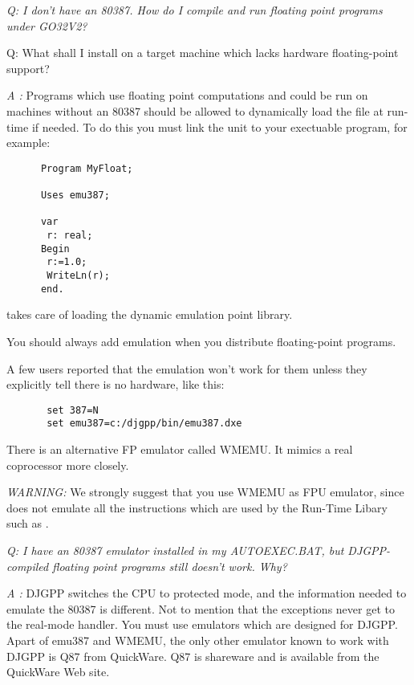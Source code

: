 \documentclass{report}
\begin{document}
{\em Q: I don't have an 80387. How do I compile and run floating point
   programs under GO32V2?

     Q: What shall I install on a target machine which lacks hardware
   floating-point support?
}

{\em A :}
 Programs which use floating point computations and could be run on
   machines without an 80387 should be allowed to dynamically load the
   file at run-time if needed. To do this you must link the  unit to your
   exectuable program, for example:

\begin{verbatim}
      Program MyFloat;

      Uses emu387;

      var
       r: real;
      Begin
       r:=1.0;
       WriteLn(r);
      end.
\end{verbatim}

    takes care of loading the dynamic emulation point library.

   You should always add emulation when you distribute floating-point
   programs.

   A few users reported that the emulation won't work for them unless
   they explicitly tell  there is no  hardware, like this:

\begin{verbatim}
       set 387=N
       set emu387=c:/djgpp/bin/emu387.dxe
\end{verbatim}

   There is an alternative FP emulator called WMEMU. It mimics a real
   coprocessor more closely.

   {\em WARNING:} We strongly suggest that you use WMEMU as FPU emulator, since
    does not emulate all the instructions which are used by the
   Run-Time Libary such as .


{\em   Q: I have an 80387 emulator installed in my AUTOEXEC.BAT, but
   DJGPP-compiled floating point programs still doesn't work. Why?
}


{\em   A :} DJGPP switches the CPU to protected mode, and the information
   needed to emulate the 80387 is different. Not to mention that the
   exceptions never get to the real-mode handler. You must use emulators
   which are designed for DJGPP. Apart of emu387 and WMEMU, the only
   other emulator known to work with DJGPP is Q87 from QuickWare. Q87 is
   shareware and is available from the QuickWare Web site.
\end{document}
